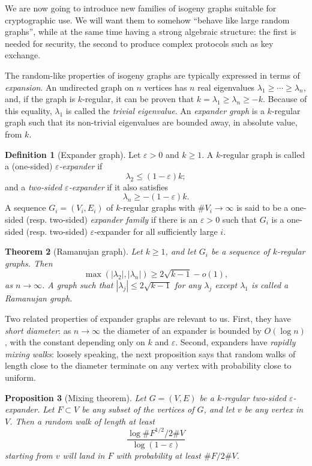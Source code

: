 \documentclass{report}
\theoremstyle{plain}
\newtheorem{theorem}{Theorem}
\newtheorem{proposition}[theorem]{Proposition}
\theoremstyle{definition}
\newtheorem{definition}[theorem]{Definition}
\begin{document}
We are now going to introduce new families of isogeny graphs suitable
for cryptographic use. %
We will want them to somehow ``behave like large random graphs'',
while at the same time having a strong algebraic structure: the first
is needed for security, the second to produce complex protocols such
as key exchange. %

The random-like properties of isogeny graphs are typically expressed
in terms of \emph{expansion}. %
An undirected graph on $n$ vertices has $n$ real eigenvalues
$λ_1≥\cdots≥λ_n$, and, if the graph is $k$-regular, it can be proven
that $k=λ_1≥λ_n≥-k$. %
Because of this equality, $λ_1$ is called the \emph{trivial
  eigenvalue}. %
An \emph{expander graph} is a $k$-regular graph such that its
non-trivial eigenvalues are bounded away, in absolute value, from
$k$. %

\begin{definition}[Expander graph]
  Let $ε>0$ and $k≥1$. A $k$-regular graph is called a (one-sided)
  \emph{$ε$-expander} if
  \[λ_2≤(1-ε)k;\]
  and a \emph{two-sided $ε$-expander} if it also satisfies
  \[λ_n≥-(1-ε)k.\] %
  A sequence $G_i=(V_i,E_i)$ of $k$-regular graphs with $\#V_i→∞$ is
  said to be a one-sided (resp. two-sided) \emph{expander family} if
  there is an $ε>0$ such that $G_i$ is a one-sided (resp. two-sided)
  $ε$-expander for all sufficiently large $i$.
\end{definition}

\begin{theorem}[Ramanujan graph]
  Let $k≥1$, and let $G_i$ be a sequence of $k$-regular graphs. %
  Then
  \[\max(|λ_2|,|λ_n|) ≥ 2\sqrt{k-1} - o(1),\]
  as $n→∞$. %
  A graph such that $|λ_j|≤2\sqrt{k-1}$ for any $λ_j$ except $λ_1$ is
  called a \emph{Ramanujan graph}.
\end{theorem}

Two related properties of expander graphs are relevant to us. %
First, they have \emph{short diameter}: as $n→∞$ the diameter of an
expander is bounded by $O(\log n)$, with the constant depending only
on $k$ and $ε$. %
Second, expanders have \emph{rapidly mixing walks}: loosely speaking,
the next proposition says that random walks of length close to the
diameter terminate on any vertex with probability close to uniform. %

\begin{proposition}[Mixing theorem]
  Let $G=(V,E)$ be a $k$-regular two-sided $ε$-expander. %
  Let $F⊂V$ be any subset of the vertices of $G$, and let $v$ be any
  vertex in $V$. %
  Then a random walk of length at least
  \[\frac{\log\#F^{1/2}/2\#V}{\log(1-ε)}\] %
  starting from $v$ will land in $F$ with probability at least
  $\#F/2\#V$.
\end{proposition}
\end{document}
